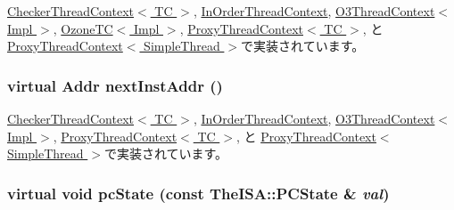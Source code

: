 \hyperlink{classCheckerThreadContext_a99768639c728ee835cce54b8b42b3d8f}{CheckerThreadContext$<$ TC $>$}, \hyperlink{classInOrderThreadContext_a99768639c728ee835cce54b8b42b3d8f}{InOrderThreadContext}, \hyperlink{classO3ThreadContext_a32d306133270d25950961c23f6be76e1}{O3ThreadContext$<$ Impl $>$}, \hyperlink{classOzoneCPU_1_1OzoneTC_a99768639c728ee835cce54b8b42b3d8f}{OzoneTC$<$ Impl $>$}, \hyperlink{classProxyThreadContext_a99768639c728ee835cce54b8b42b3d8f}{ProxyThreadContext$<$ TC $>$}, と \hyperlink{classProxyThreadContext_a99768639c728ee835cce54b8b42b3d8f}{ProxyThreadContext$<$ SimpleThread $>$}で実装されています。\hypertarget{classThreadContext_a01377ccfda419abf5f6ff7730c9eaac9}{
\subsubsection[{nextInstAddr}]{\setlength{\rightskip}{0pt plus 5cm}virtual {\bf Addr} nextInstAddr ()}}
\label{classThreadContext_a01377ccfda419abf5f6ff7730c9eaac9}


\hyperlink{classCheckerThreadContext_aceec6e28772f91b3cc921c0e3927b0c2}{CheckerThreadContext$<$ TC $>$}, \hyperlink{classInOrderThreadContext_aceec6e28772f91b3cc921c0e3927b0c2}{InOrderThreadContext}, \hyperlink{classO3ThreadContext_a4eb5bb6ecd5d32c0920ed2dce19036a0}{O3ThreadContext$<$ Impl $>$}, \hyperlink{classProxyThreadContext_aceec6e28772f91b3cc921c0e3927b0c2}{ProxyThreadContext$<$ TC $>$}, と \hyperlink{classProxyThreadContext_aceec6e28772f91b3cc921c0e3927b0c2}{ProxyThreadContext$<$ SimpleThread $>$}で実装されています。\hypertarget{classThreadContext_a8f9949be84d3a2db4137f9e49ce32952}{
\subsubsection[{pcState}]{\setlength{\rightskip}{0pt plus 5cm}virtual void pcState (const TheISA::PCState \& {\em val})}}
\label{classThreadContext_a8f9949be84d3a2db4137f9e49ce32952}


